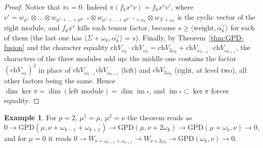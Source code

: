 \documentclass[11pt]{amsart}
\numberwithin{equation}{section}
\theoremstyle{definition}
\newtheorem{example}[equation]{Example}
\newcommand{\GPD}{\mathrm{GPD}}         %
\newcommand{\ch}{\mathrm{ch}}
\begin{document}
\begin{proof}
		Notice that $\pi\iota=0$. Indeed $\pi(f_kx^sv)=f_kx^sv'$, where $v'=w_{\mu^1}\otimes\dots\otimes w_{\mu^1+\dots+\mu^{p-2}}\otimes w_{\mu^1+\dots+\mu^{p-1}+\omega_k}\otimes w_{\Sigma+\omega_k}$ is the cyclic vector of the right module, and $f_kx^s$ kills each tensor factor, because $s\ge\langle\text{weight},\alpha_k^\vee\rangle$ for each of them (the last one has $\langle\Sigma+\omega_k,\alpha_k^\vee\rangle=s$). Finally, by Theorem~\ref{thm:GPD-fusion} and the character equality $\ch V_{\omega_k}\cdot\ch V_{\omega_k}=\ch V_{2\omega_k}+\ch V_{\omega_{k-1}}\cdot\ch V_{\omega_{k+1}}$, the characters of the three modules add up: the middle one contains the factor $(\ch V_{\omega_k})^2$ in place of $\ch V_{\omega_{k-1}}\ch V_{\omega_{k+1}}$ (left) and $\ch V_{2\omega_k}$ (right, at level two), all other factors being the same. Hence $\dim\ker\pi=\dim(\text{left module})=\dim\operatorname{im}\iota$, and $\operatorname{im}\iota\subset\ker\pi$ forces equality.
	\end{proof}
	\begin{example}
		For $p=2$, $\mu^1=\mu$, $\mu^2=\nu$ the theorem reads as
		\[
		0\to\GPD(\mu,\nu+\omega_{k-1}+\omega_{k+1})\to\GPD(\mu,\nu+2\omega_k)\to\GPD(\mu+\omega_k,\nu)\to0,
		\]
		and for $\mu=0$ it reads $0\to W_{\nu+\omega_{k-1}+\omega_{k+1}}\to W_{\nu+2\omega_k}\to\GPD(\omega_k,\nu)\to0$.
		
	\end{example}
	
\end{document}
